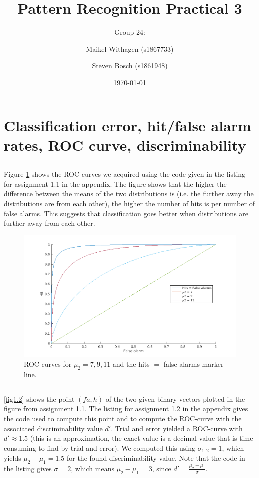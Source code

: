 \documentclass[10pt]{article}
\title{Pattern Recognition Practical 3}
\author{Group 24: \and Maikel Withagen (s1867733) \and Steven Bosch (s1861948)}
\date{\today}
\begin{document}
\maketitle

\section{Classification error, hit/false alarm rates, ROC curve, discriminability}
\subsection{}
Figure \ref{fig1.1} shows the ROC-curves we acquired using the code given in the listing for assignment 1.1 in the appendix. The figure shows that the higher the difference between the means of the two distributions is (i.e. the further away the distributions are from each other), the higher the number of hits is per number of false alarms. This suggests that classification goes better when distributions are further away from each other.

\begin{figure}[H]
 \centering
 \includegraphics[width=\textwidth]{assign1_1.png}
 \caption{ROC-curves for $\mu_2={7, 9, 11}$ and the hits $=$ false alarms marker line.}
 \label{fig1.1}
\end{figure}

\subsection{}
\autoref{fig1.2} shows the point $(fa, h)$ of the two given binary vectors plotted in the figure from assignment 1.1. The listing for assignment 1.2 in the appendix gives the code used to compute this point and to compute the ROC-curve with the associated discriminability value $d'$. Trial and error yielded a ROC-curve with $d' \approx 1.5$ (this is an approximation, the exact value is a decimal value that is time-consuming to find by trial and error). We computed this using $\sigma_{1,2} = 1$, which yields $\mu_2-\mu_1 = 1.5$ for the found discriminability value. Note that the code in the listing gives $\sigma = 2$, which means $\mu_2-\mu_1 = 3$, since $d' = \frac{\mu_2-\mu_1}{\sigma}$.
\end{document}
